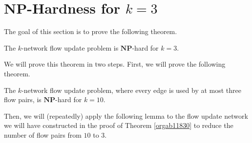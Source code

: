\documentclass[fontsize=11pt,paper=a4]{book}
\begin{document}
\part{\(\textbf{NP}\)-Hardness for \(k=3\)}
\label{sec:orgfb8bee9}

The goal of this section is to prove the following theorem.

\begin{thm}
The \(k\)-network flow update problem is \(\textbf{NP}\)-hard for \(k=3\).
\label{org5c36cda}
\end{thm}

We will prove this theorem in two steps.
First, we will prove the following theorem.

\begin{thm}
The \(k\)-network flow update problem, where every edge is used by at most three flow pairs, is \(\textbf{NP}\)-hard for \(k=10\).
\label{orgab11830}
\end{thm}

Then, we will (repeatedly) apply the following lemma to the flow update network we will have constructed in the proof of Theorem \ref{orgab11830} to reduce the number of flow pairs from \(10\) to \(3\).
\end{document}
